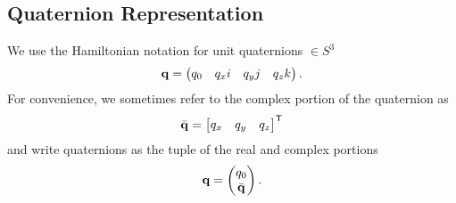 
\subsection{Quaternion Representation}

We use the Hamiltonian notation for unit quaternions $\in S^3$
\begin{equation}
\q=\begin{pmatrix}q_{0} & q_{x}i & q_{y} j & q_{z}k \end{pmatrix}.%
\end{equation}
For convenience, we sometimes refer to the complex portion of the quaternion as
\begin{equation}
	\bar{\boldsymbol{\mathrm{q}}} = \begin{bmatrix} q_x & q_y & q_z \end{bmatrix} ^{\mathsf{T}}
\end{equation}
and write quaternions as the tuple of the real and complex portions
\begin{equation}
	\boldsymbol{\mathrm{q}} = \begin{pmatrix} q_0 \\ \bar{\boldsymbol{\mathrm{q}}} \end{pmatrix}.
\end{equation}

